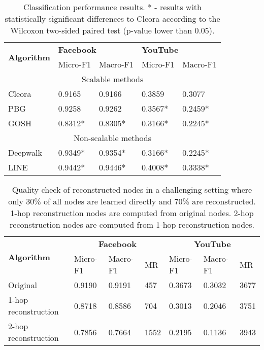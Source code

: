 \documentclass{IEEEtran}
\begin{document}
\begin{table}
\centering
\begin{tabular}{l|ll|ll}
 \multirow{2}{1mm}{\textbf{Algorithm}} & \multicolumn{2}{l}{\textbf{Facebook}} & \multicolumn{2}{l}{\textbf{YouTube}} \\
  & Micro-F1 & Macro-F1 & Micro-F1 & Macro-F1 \\\hline
  
     \multicolumn{5}{c}{Scalable methods} \\
   \hline
Cleora & 0.9165 & 0.9166 & 0.3859 & 0.3077 \\
 PBG & 0.9258 & 0.9262 & 0.3567* & 0.2459* \\
 GOSH & 0.8312* & 0.8305* & 0.3166* & 0.2245*  \\
 \hline
 \multicolumn{5}{c}{Non-scalable methods} \\
   \hline
 Deepwalk & 0.9349* & 0.9354* & 0.3166* & 0.2245*  \\
 LINE & 0.9442* & 0.9446* & 0.4008* & 0.3338* \\
 \hline
\end{tabular}
\caption{Classification performance results. * - results with statistically significant differences to Cleora according to the Wilcoxon two-sided paired test (p-value lower than 0.05).}
\label{performance-classification}
\end{table}



\begin{table*}
\small
\centering
\begin{tabular}{l|lll|lll}
 \multirow{2}{1mm}{\textbf{Algorithm}} & \multicolumn{3}{c}{\textbf{Facebook}} & \multicolumn{3}{c}{\textbf{YouTube}} \\
  & Micro-F1 & Macro-F1 & MR & Micro-F1 & Macro-F1 & MR \\\hline
Original & 0.9190 & 0.9191 & 457 & 0.3673 & 0.3032 & 3677 \\
1-hop reconstruction & 0.8718 & 0.8586 & 704 & 0.3013 & 0.2046 & 3751 \\
2-hop reconstruction & 0.7856 & 0.7664 & 1552 & 0.2195 & 0.1136 & 3943 \\
 \hline
\end{tabular}
\caption{Quality check of reconstructed nodes in a challenging setting where only 30\% of all nodes are learned directly and 70\% are reconstructed. 1-hop reconstruction nodes are computed from original nodes. 2-hop reconstruction nodes are computed from 1-hop reconstruction nodes.}
\label{performance-reconstruction}
\end{table*}
\end{document}
